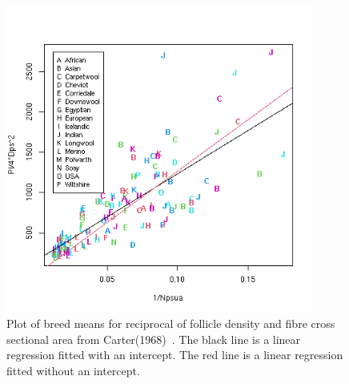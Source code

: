 %

\begin{figure}[h]
  \centering
   \includegraphics[width=0.9\textwidth]{cartercsax1ovnreg.png}
  \caption{Plot of breed means for reciprocal of follicle density and fibre cross sectional area from Carter(1968)~\cite{cart:68}. The black line is a linear regression fitted with an intercept. The red line is a linear regression fitted without an intercept.}
  \label{fig:carter1ovnxcreg}
\end{figure}

%

